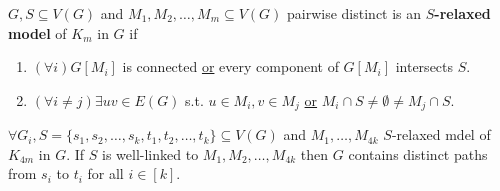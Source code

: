 \begin{defn}
	$G, S \subseteq V(G)$ and $M_{1}, M_{2}, \dots, M_{m} \subseteq V(G)$ pairwise distinct is an \textbf{$S$-relaxed model} of $K_{m}$ in $G$ if
	
	\begin{enumerate}
		\item $(\forall i) G[M_{i}]$ is connected \underline{or} every component of $G[M_{i}]$ intersects $S$.
		\item $(\forall i \neq j) \exists uv \in E(G)$ s.t. $u \in M_{i}, v \in M_{j}$ \underline{or} $M_{i} \cap S \neq \emptyset \neq M_{j} \cap S$.
	\end{enumerate}
\end{defn}

\begin{thm}[\textcolor{mygreen}{Slightly changed}]
	$\forall G_{i}, S = \{s_{1}, s_{2}, \dots, s_{k}, t_{1}, t_{2}, \dots, t_{k}\} \subseteq V(G)$ and $M_{1}, \dots, M_{4k}$ \textcolor{mygreen}{$S$-relaxed mdel} of $K_{4m}$ in $G$. If $S$  is well-linked to $M_{1}, M_{2}, \dots, M_{4k}$ then $G$ contains distinct paths from $s_{i}$ to $t_{i}$ for all $i \in [k]$.
\end{thm}

